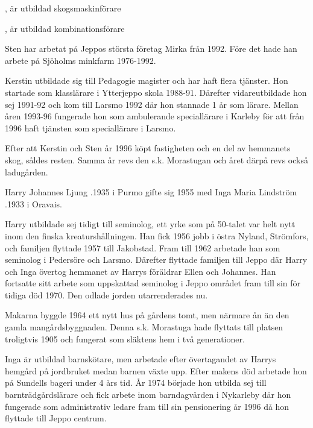 \begin{jhchildren}
  \item {}, är utbildad skogsmaskinförare
  \item {}, är utbildad kombinationsförare
\end{jhchildren}


Sten har arbetat på Jeppos största företag Mirka från 1992. Före det hade han arbete på Sjöholms minkfarm 1976-1992.

Kerstin utbildade sig till Pedagogie magister och har haft flera tjänster. Hon startade som klasslärare i Ytterjeppo skola 1988-91. Därefter vidareutbildade hon sej 1991-92 och kom till Larsmo 1992 där hon stannade 1 år som lärare. Mellan åren 1993-96 fungerade hon som ambulerande speciallärare i Karleby för att från 1996 haft tjänsten som speciallärare i Larsmo.

Efter att Kerstin och Sten år 1996 köpt fastigheten och en del av hemmanets skog, såldes resten. Samma år revs den s.k. Morastugan och året därpå revs också ladugården.



Harry Johannes Ljung .1935 i Purmo gifte sig 1955 med Inga Maria Lindström .1933 i Oravais.

Harry utbildade sej tidigt till seminolog, ett yrke som på 50-talet var helt nytt inom den finska kreaturshållningen. Han fick 1956 jobb i östra Nyland, Strömfors, och familjen flyttade 1957 till Jakobstad. Fram till 1962 arbetade han som seminolog i Pedersöre och Larsmo. Därefter flyttade familjen till Jeppo där Harry och Inga övertog hemmanet av Harrys föräldrar Ellen och Johannes. Han fortsatte sitt arbete som uppskattad seminolog i Jeppo området fram till sin för tidiga död 1970. Den odlade jorden utarrenderades nu.

Makarna byggde 1964 ett nytt hus på gårdens tomt, men närmare ån än den gamla mangårdsbyggnaden. Denna s.k. Morastuga hade flyttats till platsen troligtvis 1905 och fungerat som släktens hem i två generationer.

Inga är utbildad barnskötare, men arbetade efter övertagandet av Harrys hemgård på jordbruket medan barnen växte upp. Efter makens död arbetade hon på Sundells bageri under 4 års tid. År 1974 började hon utbilda sej till barnträdgårdslärare och fick arbete inom barndagvården i Nykarleby där hon fungerade som administrativ ledare fram till sin pensionering år 1996 då hon flyttade till Jeppo centrum.

